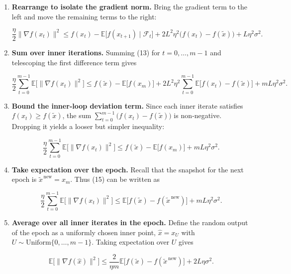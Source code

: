 \documentclass{article}
\newcommand{\E}{\mathbb{E}}
\begin{document}
\begin{enumerate}[label=[Step \arabic*], leftmargin=*, nosep]
\[
\E\!\bigl[f(x_{t+1})\mid\mathcal{F}_t\bigr]
\le f(x_t)
    -\frac{\eta}{2}\|\nabla f(x_t)\|^{2}
    +2L^{2}\eta^{2}\bigl(f(x_t)-f(\tilde{x})\bigr)
    +L\eta^{2}\sigma^{2}.
\tag{12}
\]

\item \textbf{Rearrange to isolate the gradient norm.}
Bring the gradient term to the left and move the remaining terms to the right:

\[
\frac{\eta}{2}\|\nabla f(x_t)\|^{2}
\le f(x_t)-\E\!\bigl[f(x_{t+1})\mid\mathcal{F}_t\bigr]
     +2L^{2}\eta^{2}\bigl(f(x_t)-f(\tilde{x})\bigr)
     +L\eta^{2}\sigma^{2}.
\tag{13}
\]

\item \textbf{Sum over inner iterations.}  
Summing (13) for \(t=0,\dots,m-1\) and telescoping the first difference term gives

\[
\frac{\eta}{2}\sum_{t=0}^{m-1}\E\!\bigl[\|\nabla f(x_t)\|^{2}\bigr]
\le f(\tilde{x})- \E\!\bigl[f(x_{m})\bigr]
   +2L^{2}\eta^{2}\sum_{t=0}^{m-1}\E\!\bigl[f(x_t)-f(\tilde{x})\bigr]
   +mL\eta^{2}\sigma^{2}.
\tag{14}
\]

\item \textbf{Bound the inner‑loop deviation term.}  
Since each inner iterate satisfies \(f(x_t)\ge f(\tilde{x})\), the sum
\(\sum_{t=0}^{m-1}\bigl(f(x_t)-f(\tilde{x})\bigr)\) is non‑negative.
Dropping it yields a looser but simpler inequality:

\[
\frac{\eta}{2}\sum_{t=0}^{m-1}\E\!\bigl[\|\nabla f(x_t)\|^{2}\bigr]
\le f(\tilde{x})- \E\!\bigl[f(x_{m})\bigr] + mL\eta^{2}\sigma^{2}.
\tag{15}
\]

\item \textbf{Take expectation over the epoch.}  
Recall that the snapshot for the next epoch is \(\tilde{x}^{\,\text{new}}=x_{m}\).  
Thus (15) can be written as

\[
\frac{\eta}{2}\sum_{t=0}^{m-1}\E\!\bigl[\|\nabla f(x_t)\|^{2}\bigr]
\le \E\!\bigl[f(\tilde{x})-f(\tilde{x}^{\,\text{new}})\bigr] + mL\eta^{2}\sigma^{2}.
\tag{16}
\]

\item \textbf{Average over all inner iterates in the epoch.}  
Define the random output of the epoch as a uniformly chosen inner point,
\(\hat{x} = x_{U}\) with \(U\sim\text{Uniform}\{0,\dots,m-1\}\).  
Taking expectation over \(U\) gives

\[
\E\!\bigl[\|\nabla f(\hat{x})\|^{2}\bigr]
\le \frac{2}{\eta m}\E\!\bigl[f(\tilde{x})-f(\tilde{x}^{\,\text{new}})\bigr]
     + 2L\eta\sigma^{2}.
\tag{17}
\]


\end{enumerate}
\end{document}
